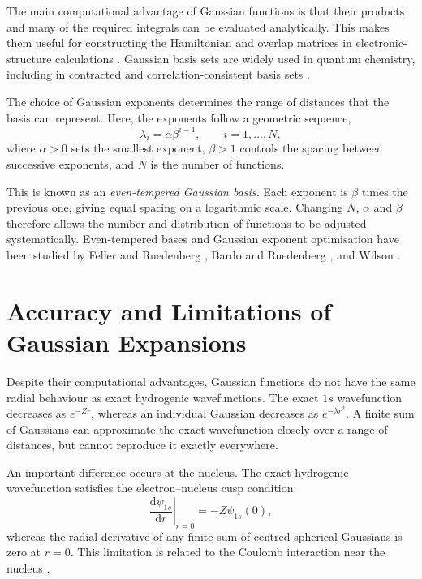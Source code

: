 The main computational advantage of Gaussian functions
is that their products and many of the required
integrals can be evaluated analytically. This makes
them useful for constructing the Hamiltonian and
overlap matrices in electronic-structure calculations
\cite{Boys1950}. Gaussian basis sets are widely used
in quantum chemistry, including in contracted and
correlation-consistent basis sets
\cite{Dunning1989,Raffenetti}.

The choice of Gaussian exponents determines the range
of distances that the basis can represent. Here, the
exponents follow a geometric sequence,
\begin{equation}
    \lambda_i=\alpha\beta^{i-1},
    \qquad i=1,\ldots,N,
    \label{eq:intro_even_tempered}
\end{equation}
where $\alpha>0$ sets the smallest exponent,
$\beta>1$ controls the spacing between successive
exponents, and $N$ is the number of functions.

This is known as an \textit{even-tempered Gaussian
basis}. Each exponent is $\beta$ times the previous
one, giving equal spacing on a logarithmic scale.
Changing $N$, $\alpha$ and $\beta$ therefore allows
the number and distribution of functions to be
adjusted systematically.
Even-tempered bases and Gaussian exponent optimisation
have been studied by Feller and Ruedenberg
\cite{FellerRuedenberg1979}, Bardo and Ruedenberg
\cite{BaR}, and Wilson \cite{Wilson}.

\newpage


\section{Accuracy and Limitations of Gaussian Expansions}

Despite their computational advantages, Gaussian
functions do not have the same radial behaviour
as exact hydrogenic wavefunctions. The exact
$1s$ wavefunction decreases as $e^{-Zr}$,
whereas an individual Gaussian decreases as
$e^{-\lambda r^2}$. A finite sum of Gaussians
can approximate the exact wavefunction closely
over a range of distances, but cannot reproduce
it exactly everywhere.

An important difference occurs at the nucleus.
The exact hydrogenic wavefunction satisfies
the electron--nucleus cusp condition:
\begin{equation}
    \left.
    \frac{\mathrm d\psi_{1s}}{\mathrm dr}
    \right|_{r=0}
    =-Z\psi_{1s}(0),
    \label{eq:intro_cusp}
\end{equation}
whereas the radial derivative of any finite
sum of centred spherical Gaussians is zero
at $r=0$. This limitation is related to the
Coulomb interaction near the nucleus
\cite{Kato,Kutzelnigg1994}.

